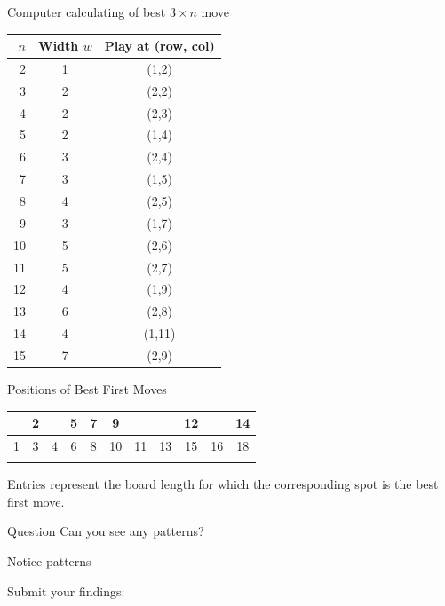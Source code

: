 \documentclass{beamer}
\begin{document}
\begin{frame}{Computer calculating of best $3\times n$ move}
\begin{center}
\begin{tabular}{r|c|c}
\hline
$n$ & Width $w$ & Play at (row, col) \\
\hline


2  & 1  & (1,2)  \\
3  & 2  & (2,2)  \\
4  & 2  & (2,3)  \\
5  & 2  & (1,4)  \\
6  & 3  & (2,4)  \\
7  & 3  & (1,5)  \\
8  & 4  & (2,5)  \\
9  & 3  & (1,7)  \\
10 & 5  & (2,6)  \\
11 & 5  & (2,7)  \\
12 & 4  & (1,9)  \\
13 & 6  & (2,8)  \\
14 & 4  & (1,11) \\
15 & 7  & (2,9)  \\
\end{tabular}
\end{center}
\end{frame}

\begin{frame}{Positions of Best First Moves}
\begin{center}
\begin{tabular}{|c|c|c|c|c|c|c|c|c|c|c|}
\hline
    & 2 &   & 5 & 7 & 9 &   &   &12 &   &14 \\\hline
  1 & 3 & 4 & 6 & 8 &10 &11 &13 &15 &16 &18 \\\hline
    &   &   &   &   &   &   &   &   &   &   \\\hline
\end{tabular}
\end{center}
Entries represent the board length for which the corresponding spot is the best first move.
\begin{block}{Question}
Can you see any patterns?
\end{block}
\end{frame}

\begin{frame}{Notice patterns}
  \begin{block}{Submit your findings:}
    \begin{center}
    \end{center}
  \end{block}
\end{frame}
\end{document}
